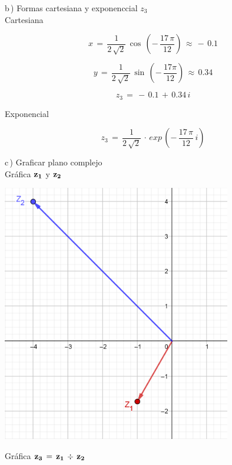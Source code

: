 \documentclass[a4paper,11pt,openany]{book}
\begin{document}
\textcolor{ao(english)}{b\,)} Formas cartesiana y exponenccial $z_{3}$\\

\textcolor{ao(english)}{} Cartesiana

$$x\,=\,\dfrac{1}{2\,\sqrt{2}}\,\cos\,\left(-\,\dfrac{17\,\pi}{12}\right)\,\approx\,-\,0.1$$

$$y\,=\,\dfrac{1}{2\,\sqrt{2}}\,\sin\,\left(-\,\dfrac{17\pi}{12}\right)\,\approx\,0.34$$

$$z_{3}\,=\,-\,0.1\,+\,0.34\,i$$

\textcolor{ao(english)}{} Exponencial

$$z_{3}\,=\,\dfrac{1}{2\,\sqrt{2}}\,\cdot\,exp\,\left(-\,\dfrac{17\,\pi}{12}\,i\right)$$

\newpage

\textcolor{ao(english)}{c\,)} Graficar plano complejo\\

\textcolor{ao(english)}{} Gráfica $\bf{z_{1}}$ y $\bf{z_{2}}$

\begin{center}
    \includegraphics[width=10cm]{Gra-Ej-5-1.png}
\end{center}

\textcolor{ao(english)}{} Gráfica $\bf{z_{3}\,=\,z_{1}\,\div\,z_{2}}$
\end{document}
